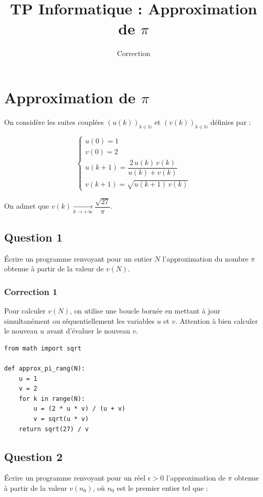 \documentclass[11pt,a4paper]{article}
\title{TP Informatique : Approximation de $\pi$}
\author{Correction}
\date{}
\begin{document}
\maketitle

\section{Approximation de $\pi$}

On considère les suites couplées $(u(k))_{k \in \mathbb{N}}$ et $(v(k))_{k \in \mathbb{N}}$ définies par :

$$
\begin{cases}
u(0) = 1 \\
v(0) = 2 \\
u(k+1) = \dfrac{2\,u(k)\,v(k)}{u(k) + v(k)} \\
v(k+1) = \sqrt{u(k+1)\,v(k)}
\end{cases}
$$

On admet que $v(k) \xrightarrow[k \to +\infty]{} \dfrac{\sqrt{27}}{\pi}$.

\subsection*{Question 1}
Écrire un programme renvoyant pour un entier $N$ l'approximation du nombre $\pi$ obtenue à partir de la valeur de $v(N)$.

\subsubsection*{Correction 1}
Pour calculer $v(N)$, on utilise une boucle bornée en mettant à jour simultanément ou séquentiellement les variables $u$ et $v$. Attention à bien calculer le nouveau $u$ avant d'évaluer le nouveau $v$.

\begin{verbatim}
from math import sqrt

def approx_pi_rang(N):
    u = 1
    v = 2
    for k in range(N):
        u = (2 * u * v) / (u + v)
        v = sqrt(u * v)
    return sqrt(27) / v
\end{verbatim}

\subsection*{Question 2}
Écrire un programme renvoyant pour un réel $\epsilon > 0$ l'approximation de $\pi$ obtenue à partir de la valeur $v(n_0)$, où $n_0$ est le premier entier tel que :
\end{document}
